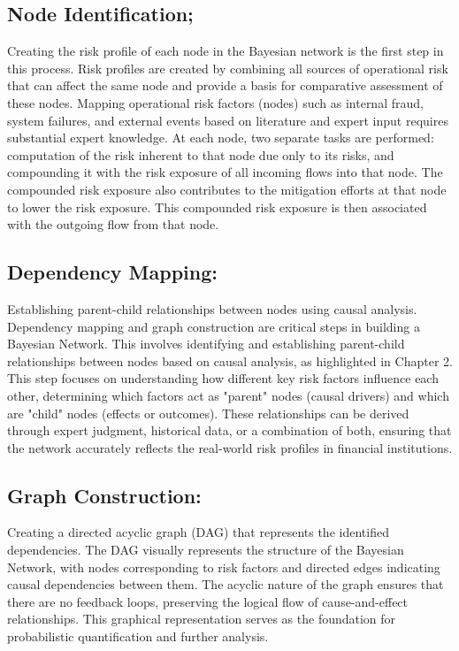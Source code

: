 \subsection{Node Identification;} 
Creating the risk profile of each node in the Bayesian network is the first step in this process. Risk profiles are created by combining all sources of operational risk that can affect the same node and provide a basis for comparative assessment of these nodes. Mapping operational risk factors (nodes) such as internal fraud, system failures, and external events based on literature and expert input requires substantial expert knowledge. At each node, two separate tasks are performed: computation of the risk inherent to that node due only to its risks, and compounding it with the risk exposure of all incoming flows into that node. The compounded risk exposure also contributes to the mitigation efforts at that node to lower the risk exposure. This compounded risk exposure is then associated with the outgoing flow from that node. 
\subsection{Dependency Mapping:}
Establishing parent-child relationships between nodes using causal analysis. Dependency mapping and graph construction are critical steps in building a Bayesian Network. This involves identifying and establishing parent-child relationships between nodes based on causal analysis, as highlighted in Chapter 2. This step focuses on understanding how different key risk factors influence each other, determining which factors act as "parent" nodes (causal drivers) and which are "child" nodes (effects or outcomes). These relationships can be derived through expert judgment, historical data, or a combination of both, ensuring that the network accurately reflects the real-world risk profiles in financial institutions. 
\subsection{Graph Construction:} 
Creating a directed acyclic graph (DAG) that represents the identified dependencies.  The DAG visually represents the structure of the Bayesian Network, with nodes corresponding to risk factors and directed edges indicating causal dependencies between them. The acyclic nature of the graph ensures that there are no feedback loops, preserving the logical flow of cause-and-effect relationships. This graphical representation serves as the foundation for probabilistic quantification and further analysis.
